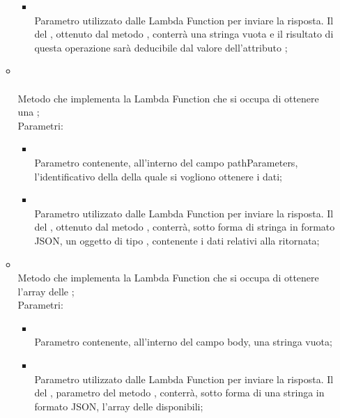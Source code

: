 \begin{itemize}
\begin{itemize}
\begin{itemize}
			\item {} \\
			Parametro utilizzato dalle Lambda Function per inviare la risposta. Il  del , ottenuto dal metodo , conterrà una stringa vuota e il risultato di questa operazione sarà deducibile dal valore dell'attributo ;
		\end{itemize}
		\item[]  \\\\		Metodo che implementa la Lambda Function che si occupa di ottenere una ;\\
		Parametri:
		\begin{itemize}
			\item {} \\
			Parametro contenente, all'interno del campo pathParameters, l'identificativo della  della quale si vogliono ottenere i dati;
			\item {} \\
			Parametro utilizzato dalle Lambda Function per inviare la risposta. Il  del , ottenuto dal metodo , conterrà, sotto forma di stringa in formato JSON, un oggetto di tipo , contenente i dati relativi alla  ritornata;
		\end{itemize}
		\item[]  \\		Metodo che implementa la Lambda Function che si occupa di ottenere l'array delle ;\\
		Parametri:
		\begin{itemize}
			\item {} \\
			Parametro contenente, all'interno del campo body, una stringa vuota;
			\item {} \\
			Parametro utilizzato dalle Lambda Function per inviare la risposta. Il  del , parametro del metodo , conterrà, sotto forma di una stringa in formato JSON,  l'array delle  disponibili;

\end{itemize}
\end{itemize}
\end{itemize}

